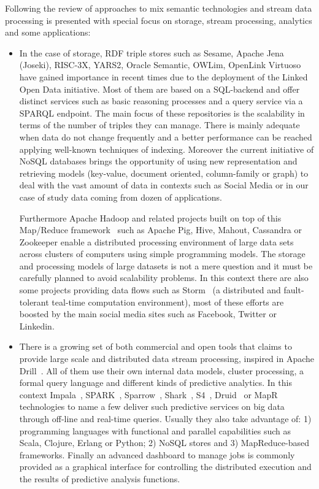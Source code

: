 Following the review of approaches to mix semantic technologies and stream data processing is 
presented with special focus on storage, stream processing, analytics and some applications:
\begin{itemize}
 \item In the case of storage, RDF triple stores such as Sesame, Apache Jena 
(Joseki), RISC-3X, YARS2, Oracle Semantic, OWLim, OpenLink Virtuoso have gained 
importance in recent times due to the deployment of the Linked Open Data initiative. Most of them are based on a SQL-backend and offer distinct 
services such as basic reasoning processes and a query service via a SPARQL 
endpoint. The main focus of these repositories is the scalability in terms of 
the number of triples they can manage. There is mainly adequate when data do not 
change frequently and a better performance can be reached applying well-known 
techniques of indexing. Moreover the current initiative of NoSQL databases 
brings the opportunity of using new representation and retrieving models (key-value, document oriented, column-family or graph) to deal with the vast amount of data in contexts such as Social Media 
or in our case of study data coming from dozen of applications.

Furthermore Apache Hadoop and related projects built on top of this Map/Reduce 
framework~\cite{Dean:2008:MSD:1327452.1327492} such as Apache Pig, Hive, Mahout, Cassandra or Zookeeper enable a 
distributed processing environment of large data sets across clusters of 
computers using simple programming models. The storage and processing models of 
large datasets is not a mere question and it must be carefully planned to avoid 
scalability problems. In this context there are also some projects providing 
data flows such as Storm~\cite{BigDataManing} (a distributed and fault-tolerant teal-time 
computation environment), most of these efforts are boosted by the main social 
media sites such as Facebook, Twitter or Linkedin. 

\item There is a growing set of both commercial and open tools that 
claims to provide large scale and distributed data stream processing, inspired in Apache Drill~\cite{hausenblas2013apache}. 
All of them use their own internal data models, cluster processing, a formal query language and different kinds of 
predictive analytics. In this context Impala~\cite{impala-project}, SPARK~\cite{zaharia2012discretized}, Sparrow~\cite{ousterhout2013sparrow},
Shark~\cite{DBLP:conf/sigmod/XinRZFSS13}, S4~\cite{neumeyer2010s4}, Druid~\cite{yangdruid} or MapR~\cite{mapr-project} technologies to name a 
few deliver such predictive services on big data through off-line and real-time queries. Usually they 
also take advantage of: 1) programming languages with functional and parallel capabilities such as Scala, Clojure, Erlang or Python; 
2) NoSQL stores and 3) MapReduce-based frameworks. Finally an advanced dashboard to manage jobs is 
commonly provided as a graphical interface for controlling the distributed execution and the results of predictive 
analysis functions.



\end{itemize}
